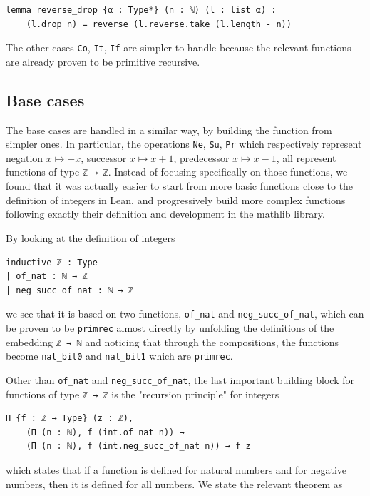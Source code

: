 \documentclass[preprint]{elsarticle}
\theoremstyle{remark}
\newcommand{\MATHLIB}{\textsf{mathlib}\xspace}
\newcommand{\LEAN}{\textsf{Lean}\xspace}
\begin{document}
\begin{lstlisting}
lemma reverse_drop {α : Type*} (n : ℕ) (l : list α) :
    (l.drop n) = reverse (l.reverse.take (l.length - n))
\end{lstlisting}

The other cases \lstinline|Co|, \lstinline|It|, \lstinline|If| are simpler to handle because the relevant functions are already proven to be primitive recursive.

\subsection{Base cases}

The base cases are handled in a similar way, by building the function from simpler ones. In particular, the operations \lstinline|Ne|, \lstinline|Su|, \lstinline|Pr| which respectively represent negation $x\mapsto-x$, successor $x\mapsto x+1$, predecessor $x\mapsto x-1$, all represent functions of type \lstinline|ℤ → ℤ|. Instead of focusing specifically on those functions, we found that it was actually easier to start from more basic functions close to the definition of integers in \LEAN, and progressively build more complex functions following exactly their definition and development in the \MATHLIB library.

By looking at the definition of integers

\begin{lstlisting}
inductive ℤ : Type
| of_nat : ℕ → ℤ
| neg_succ_of_nat : ℕ → ℤ
\end{lstlisting}

we see that it is based on two functions, \lstinline|of_nat| and \lstinline|neg_succ_of_nat|, which can be proven to be \lstinline|primrec| almost directly by unfolding the definitions of the embedding \lstinline|ℤ → ℕ| and noticing that through the compositions, the functions become \lstinline|nat_bit0| and \lstinline|nat_bit1| which are \lstinline|primrec|.

Other than \lstinline|of_nat| and \lstinline|neg_succ_of_nat|, the last important building block for functions of type \lstinline|ℤ → ℤ| is the "recursion principle" for integers

\begin{lstlisting}
Π {f : ℤ → Type} (z : ℤ),
    (Π (n : ℕ), f (int.of_nat n)) →
    (Π (n : ℕ), f (int.neg_succ_of_nat n)) → f z
\end{lstlisting}

which states that if a function is defined for natural numbers and for negative numbers, then it is defined for all numbers. We state the relevant theorem as
\end{document}
